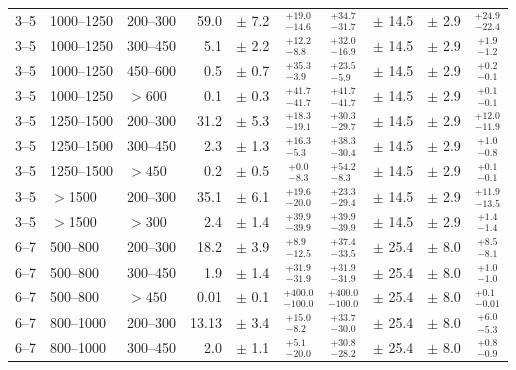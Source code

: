 \begin{table}[!hp]
{\begin{tabular}{lll|rc|cccc|c}
      \midrule
      3--5   & 1000--1250  & 200--300 & 59.0  & $\pm$  7.2  & $^{+19.0}_{-14.6}$ & $^{+34.7}_{-31.7}$ & $\pm$  14.5   & $\pm$ 2.9 & $^{+24.9}_{-22.4}$\\
      3--5   & 1000--1250  & 300--450 & 5.1   & $\pm$  2.2  & $^{+12.2}_{-8.8}$ & $^{+32.0}_{-16.9}$ & $\pm$  14.5   & $\pm$ 2.9 & $^{+1.9}_{-1.2}$ \\
      3--5   & 1000--1250  & 450--600 & 0.5   & $\pm$  0.7  & $^{+35.3}_{-3.9}$ & $^{+23.5}_{-5.9}$ &  $\pm$  14.5   & $\pm$ 2.9 & $^{+0.2}_{-0.1}$ \\
      3--5   & 1000--1250  & $>600$  & 0.1   & $\pm$  0.3  & $^{+41.7}_{-41.7}$ & $^{+41.7}_{-41.7}$ & $\pm$ 14.5   &  $\pm$ 2.9 & $^{+0.1}_{-0.1}$ \\
      \midrule
      3--5   & 1250--1500  & 200--300 & 31.2  & $\pm$  5.3  & $^{+18.3}_{-19.1}$ & $^{+30.3}_{-29.7}$ & $\pm$  14.5  & $\pm$ 2.9 & $^{+12.0}_{-11.9}$\\
      3--5   & 1250--1500  & 300--450 & 2.3   & $\pm$  1.3  & $^{+16.3}_{-5.3}$ & $^{+38.3}_{-30.4}$ & $\pm$  14.5  & $\pm$ 2.9 & $^{+1.0}_{-0.8}$ \\
      3--5   & 1250--1500  & $>450$  & 0.2   & $\pm$  0.5  & $^{+0.0}_{-8.3}$ & $^{+54.2}_{-8.3}$  & $\pm$   14.5 & $\pm$ 2.9 & $^{+0.1}_{-0.1}$  \\
      \midrule
      3--5   & $>$1500    & 200--300 & 35.1  & $\pm$  6.1  & $^{+19.6}_{-20.0}$ & $^{+23.3}_{-29.4}$ & $\pm$   14.5 & $\pm$ 2.9 & $^{+11.9}_{-13.5}$ \\
      3--5   & $>$1500    & $>300$  & 2.4   & $\pm$  1.4  & $^{+39.9}_{-39.9}$ & $^{+39.9}_{-39.9}$ & $\pm$   14.5 & $\pm$ 2.9 & $^{+1.4}_{-1.4}$ \\
      \midrule 
      \midrule
      6--7   & 500--800   & 200--300  &  18.2 & $\pm$  3.9  & $^{+8.9}_{-12.5}$ & $^{+37.4}_{-33.5}$ & $\pm$  25.4  & $\pm$ 8.0 & $^{+8.5}_{-8.1}$  \\
      6--7   & 500--800   & 300--450  &  1.9  & $\pm$  1.4  & $^{+31.9}_{-31.9}$ & $^{+31.9}_{-31.9}$ & $\pm$  25.4 & $\pm$ 8.0 & $^{+1.0}_{-1.0}$  \\
      6--7   & 500--800   & $>450$   &  0.01 & $\pm$  0.1  & $^{+400.0}_{-100.0}$ & $^{+400.0}_{-100.0}$ & $\pm$  25.4 & $\pm$ 8.0 & $^{+0.1}_{-0.01}$\\
      \midrule
      6--7   & 800--1000  & 200--300  &  13.13& $\pm$  3.4  & $^{+15.0}_{-8.2}$ & $^{+33.7}_{-30.0}$ & $\pm$  25.4  & $\pm$ 8.0 & $^{+6.0}_{-5.3}$  \\
      6--7   & 800--1000  & 300--450  &  2.0  & $\pm$  1.1  & $^{+5.1}_{-20.0}$ & $^{+30.8}_{-28.2}$ & $\pm$  25.4  & $\pm$ 8.0 & $^{+0.8}_{-0.9}$  \\

\end{tabular}}
\end{table}
